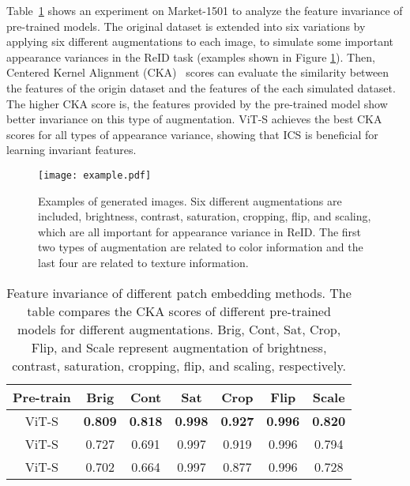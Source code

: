 \documentclass[10pt,twocolumn,letterpaper]{article}
\begin{document}
Table~\ref{tab:feat} shows an experiment on Market-1501 to analyze the feature invariance of pre-trained models. The original dataset is extended into six variations by applying six different augmentations to each image, to simulate some important appearance variances in the ReID task (examples shown in Figure \ref{fig:example}). Then, Centered Kernel Alignment (CKA)~\cite{cka} scores can evaluate the similarity between the features of the origin dataset and the features of the each simulated dataset. The higher CKA score is, the features provided by the pre-trained model show better invariance on this type of augmentation. ViT-S achieves the best CKA scores for all types of appearance variance, showing that ICS is beneficial for learning invariant features.

\begin{figure}[htb]
    \centering
	\texttt{[image: example.pdf]}
	\caption{Examples of generated images. Six different augmentations are included, \ie brightness, contrast, saturation, cropping, flip, and scaling, which are all important for appearance variance in ReID. The first two types of augmentation are related to color information and the last four are related to texture information.} 
	\label{fig:example}
	\vspace{-1em}
\end{figure}

\begin{table}[htb]\small
    \begin{center}\setlength\tabcolsep{5pt}
    \begin{tabular}{c|cccccc}
    \hline
    Pre-train & Brig & Cont & Sat & Crop & Flip & Scale \\
    \hline
    ViT-S &\textbf{0.809} &\textbf{0.818} &\textbf{0.998} &\textbf{0.927} &\textbf{0.996} &\textbf{0.820} \\
    ViT-S & 0.727 & 0.691 & 0.997& 0.919 & 0.996 & 0.794 \\
    ViT-S   &0.702 &0.664 & 0.997 &0.877 &0.996 & 0.728\\
    \hline
    \end{tabular}\end{center}
    \vspace{-1em}
    \caption{\label{tab:feat} Feature invariance of different patch embedding methods. 
     The table compares the CKA scores of different pre-trained models for  different augmentations. Brig, Cont, Sat, Crop, Flip, and Scale represent augmentation of brightness, contrast, saturation, cropping, flip, and scaling, respectively.} 
     \vspace{-1.5em}
\end{table}
\end{document}
